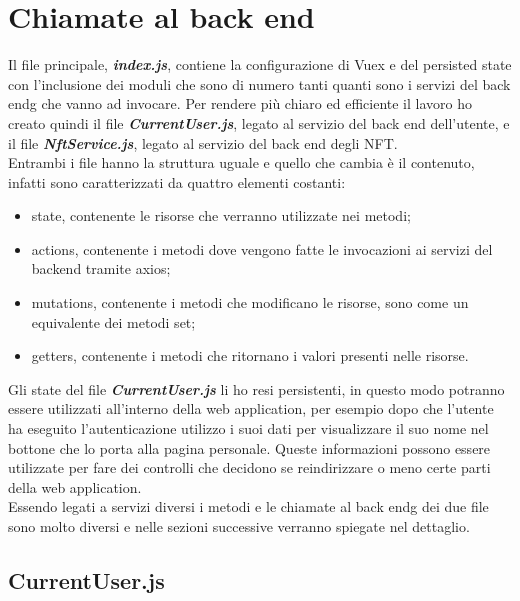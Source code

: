 \section{Chiamate al back end}
Il file principale, \textbf{\textit{index.js}}, contiene la configurazione di Vuex e del persisted state con l'inclusione dei moduli che sono di numero tanti quanti sono i servizi del \gls{back endg} che vanno ad invocare. Per rendere più chiaro ed efficiente il lavoro ho creato quindi il file \textbf{\textit{CurrentUser.js}}, legato al servizio del back end dell'utente, e il file \textbf{\textit{NftService.js}}, legato al servizio del back end degli NFT.\\
Entrambi i file hanno la struttura uguale e quello che cambia è il contenuto, infatti sono caratterizzati da quattro elementi costanti:
\begin{itemize}
	\item state, contenente le risorse che verranno utilizzate nei metodi;
	\item actions, contenente i metodi dove vengono fatte le invocazioni ai servizi del backend tramite axios;
	\item mutations, contenente i metodi che modificano le risorse, sono come un equivalente dei metodi set;
	\item getters, contenente i metodi che ritornano i valori presenti nelle risorse.
\end{itemize}

Gli state del file \textbf{\textit{CurrentUser.js}} li ho resi persistenti, in questo modo potranno essere utilizzati all'interno della web application, per esempio dopo che l'utente ha eseguito l'autenticazione utilizzo i suoi dati per visualizzare il suo nome nel bottone che lo porta alla pagina personale. Queste informazioni possono essere utilizzate per fare dei controlli che decidono se reindirizzare o meno certe parti della web application.\\
Essendo legati a servizi diversi i metodi e le chiamate al \gls{back endg} dei due file sono molto diversi e nelle sezioni successive verranno spiegate nel dettaglio.

\subsection{CurrentUser.js}

